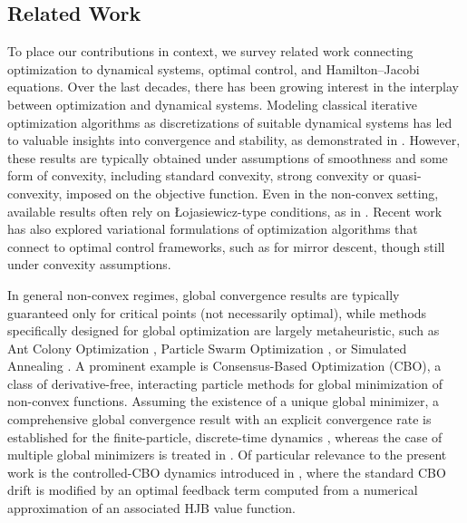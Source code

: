\documentclass[12pt]{amsart}
\numberwithin{equation}{section}
\theoremstyle{plain}
\begin{document}
\subsection*{Related Work}
To place our contributions in context, we survey related work connecting optimization to dynamical systems, optimal control, and Hamilton--Jacobi equations.
Over the last decades, there has been growing interest in the interplay between optimization and dynamical systems. Modeling classical iterative optimization algorithms as discretizations of suitable dynamical systems has led to valuable insights into convergence and stability, as demonstrated in \cite{alvarez2002second,attouch2019rate,su2016differential,siegel2024qualitative,attouch2000heavy,muehlebach2019dynamical,polyak2017lyapunov,franca2018admm,siegel2019accelerated,shi2022understanding}. However, these results are typically obtained under assumptions of smoothness and some form of convexity, including standard convexity, strong convexity or quasi-convexity, imposed on the objective function. Even in the non-convex setting, available results often rely on \L{}ojasiewicz-type conditions, as in \cite{apidopoulos2022nonconvex,aujol2023convergence}. Recent work has also explored variational formulations of optimization algorithms that connect to optimal control frameworks, such as \cite{tzen2023variational} for mirror descent, though still under convexity assumptions.

In general non-convex regimes, global convergence results are typically guaranteed only for critical points (not necessarily optimal), while methods specifically designed for global optimization are largely metaheuristic, such as Ant Colony Optimization \cite{dorigo2006ant}, Particle Swarm Optimization \cite{wang2018particle}, or Simulated Annealing \cite{bertsimas1993simulated}. A prominent example is Consensus-Based Optimization (CBO), a class of derivative-free, interacting particle methods for global minimization of non-convex functions. Assuming the existence of a unique global minimizer, a comprehensive global convergence result with an explicit convergence rate is established for the finite-particle, discrete-time dynamics \cite{fornasier2024consensus,fornasier2022convergence}, whereas the case of multiple global minimizers is treated in \cite{huang2025faithful}. Of particular relevance to the present work is the controlled-CBO dynamics introduced in \cite{huang2024fast}, where the standard CBO drift is modified by an optimal feedback term computed from a numerical approximation of an associated HJB value function.
\end{document}
